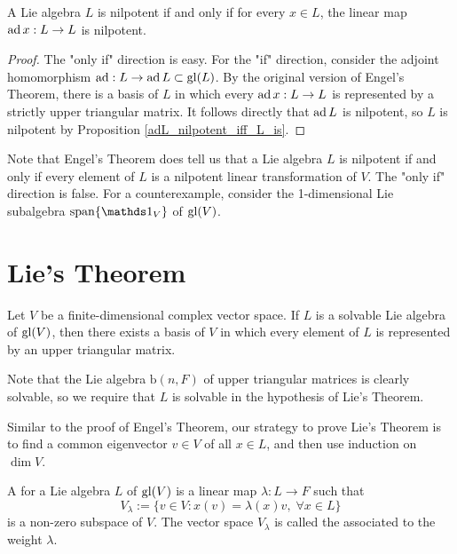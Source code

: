 \begin{thm}
    A Lie algebra $L$ is nilpotent if and only if for every $x\in L$, the linear map $\operatorname{ad} x:L\to L$ is nilpotent.
\end{thm}

\begin{proof}
    The "only if" direction is easy. For the "if" direction, consider the adjoint homomorphism $\operatorname{ad}:L\to \operatorname{ad} L\subset \mathrm{gl}(L)$. By the original version of Engel's Theorem, there is a basis of $L$ in which every $\operatorname{ad} x:L\to L$ is represented by a strictly upper triangular matrix. It follows directly that $\operatorname{ad} L$ is nilpotent, so $L$ is nilpotent by Proposition \ref{adL_nilpotent_iff_L_is}.
\end{proof}

\begin{rem}
    Note that Engel's Theorem does  tell us that a Lie algebra $L$ is nilpotent if and only if every element of $L$ is a nilpotent linear transformation of $V$. The "only if" direction is false. For a counterexample, consider the 1-dimensional Lie subalgebra $\span \{\id_V\}$ of $\mathrm{gl}(V)$. 
\end{rem}

\section{Lie's Theorem}

\begin{thm}
    Let $V$ be a finite-dimensional complex vector space. If $L$ is a solvable Lie algebra of $\mathrm{gl}(V)$, then there exists a basis of $V$ in which every element of $L$ is represented by an upper triangular matrix.
\end{thm}

Note that the Lie algebra $\mathrm{b}(n,F)$ of upper triangular matrices is clearly solvable, so we require that $L$ is solvable in the hypothesis of Lie's Theorem.

Similar to the proof of Engel's Theorem, our strategy to prove Lie's Theorem is to find a common eigenvector $v\in V$ of all $x\in L$, and then use induction on $\dim V$.

\begin{defn}
    A  for a Lie algebra $L$ of $\mathrm{gl}(V)$ is a linear map $\lambda:L\to F$ such that 
    \[
        V_\lambda:=\{v\in V:x(v)=\lambda(x)v,\;\forall x\in L\}
    \]
    is a non-zero subspace of $V$. The vector space $V_\lambda$ is called the  associated to the weight $\lambda$. 
\end{defn}

